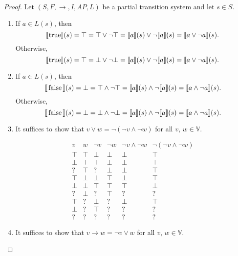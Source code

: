 \documentclass[12pt]{article}
\newcommand{\TRUE}{\mbox{\lstinline{true}}}
\newcommand{\FALSE}{\mbox{\lstinline{false}}}
\theoremstyle{definition}
\newcommand{\satisfaction}[1]{\llbracket #1 \rrbracket}
\newcommand{\bottom}{\mathord{\perp}}
\begin{document}
\begin{proof}
Let $(S, F, \rightarrow, I, \mathit{AP}, L)$ be a partial transition system and let $s \in S$.
\begin{enumerate}
\item 
If $a \in L(s)$, then
\[
\satisfaction{\TRUE}(s) = \top = \top \vee \neg \top = \satisfaction{a}(s) \vee \neg \satisfaction{a}(s) = \satisfaction{a \vee \neg a}(s).
\]
Otherwise,
\[
\satisfaction{\TRUE}(s) = \top = \bottom \vee \neg \bottom = \satisfaction{a}(s) \vee \neg \satisfaction{a}(s) = \satisfaction{a \vee \neg a}(s).
\]
\item
If $a \in L(s)$, then
\[
\satisfaction{\FALSE}(s) = \bottom = \top \wedge \neg \top = \satisfaction{a}(s) \wedge \neg \satisfaction{a}(s) = \satisfaction{a \wedge \neg a}(s).
\]
Otherwise,
\[
\satisfaction{\FALSE}(s) = \bottom = \bottom \wedge \neg \bottom = \satisfaction{a}(s) \wedge \neg \satisfaction{a}(s) = \satisfaction{a \wedge \neg a}(s).
\]
\item
It suffices to show that $v \vee w = \neg(\neg v \wedge \neg w)$ for all $v$, $w \in \mathbb{V}$.

\[
\begin{array}{ll|lll|l}
v     & w     & \neg v & \neg w & \neg v \wedge \neg w & \neg(\neg v \wedge \neg w)\\\hline
\top  & \top  & \bottom  & \bottom  & \bottom                & \top\\
\bottom & \top  & \top   & \bottom  & \bottom                & \top\\
?     & \top  & ?      & \bottom  & \bottom                & \top\\
\top  & \bottom & \bottom  & \top   & \bottom                & \top\\
\bottom & \bottom & \top   & \top   & \top                 & \bottom\\
?     & \bottom & ?      & \top   & ?                    & ?\\
\top  & ?     & \bottom  & ?      & \bottom                & \top\\
\bottom & ?     & \top   & ?      & ?                    & ?\\
?     & ?     & ?      & ?      & ?                    & ?
\end{array}
\]
\item
It suffices to show that $v \rightarrow w = \neg v \vee w$ for all $v$, $w \in \mathbb{V}$.


\end{enumerate}
\end{proof}
\end{document}
